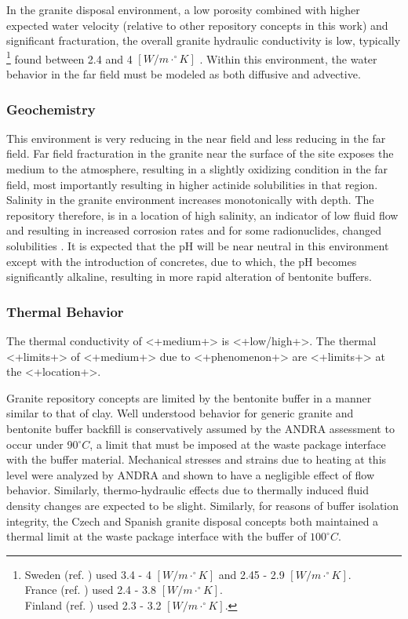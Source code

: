 {In the granite disposal environment, a low porosity combined with 
higher expected water velocity (relative to other repository concepts in this 
work) and significant fracturation, the overall 
granite hydraulic conductivity is low, typically
\footnote{
Sweden (ref. \cite{ab_long-term_2006}) used 3.4 - 4 $[W/m\cdot^{\circ}K]$ and 2.45 - 2.9 $[W/m\cdot^{\circ}K]$.\\
France (ref. \cite{andra_argile:_2005}) used 2.4 - 3.8 $[W/m\cdot^{\circ}K]$.\\
Finland (ref. \cite{posiva_interim_2010}) used 2.3 - 3.2 $[W/m\cdot^{\circ}K]$. 
}
found between 2.4 and 4 $[W/m\cdot^{\circ}K]$ 
\cite{schwartz_fundamentals_2004, 
hardin_generic_2011}. Within this environment, the  
water behavior in the far field must be modeled as both diffusive and advective.

\subsubsection{Geochemistry}

This environment is very reducing in the near field and less reducing in the 
far field. Far field fracturation in the granite near the surface of the site 
exposes the medium to the atmosphere, resulting in a slightly oxidizing 
condition in the far field, most importantly resulting in higher actinide 
solubilities in that region. Salinity in the granite environment increases 
monotonically with depth. The repository therefore, is in a location of high 
salinity, an indicator of low fluid flow and resulting in increased corrosion 
rates and for some radionuclides, changed solubilities \cite{argile_granite:_2005}.
It is expected that the pH will be near neutral in this environment except with  
the introduction of concretes, due to which, the pH becomes significantly 
alkaline, resulting in more rapid alteration of bentonite buffers. 

\subsubsection{Thermal Behavior}

The thermal conductivity of <+medium+> is <+low/high+>. The thermal  <+limits+> 
of <+medium+> due to <+phenomenon+> are <+limits+> at the <+location+>.

Granite repository concepts are limited by the bentonite buffer in a manner 
similar to that of clay. 
Well understood behavior for generic granite and bentonite buffer backfill
is conservatively assumed by the \gls{ANDRA} assessment to occur under 
90$^{\circ}C$, a limit that must be imposed at the waste package interface with 
the buffer material.  Mechanical stresses and strains due to heating at this 
level were analyzed by \gls{ANDRA} and shown to have a negligible effect of 
flow behavior. Similarly, thermo-hydraulic effects due to thermally induced 
fluid density changes are expected to be slight. \cite{andra_argile:_2005}
Similarly, for reasons of buffer isolation integrity, the Czech and Spanish
granite disposal concepts both maintained a thermal limit at the waste package
interface with the buffer of $100^{\circ}C$.  \cite{von_lensa_red-impact_2008}

}
